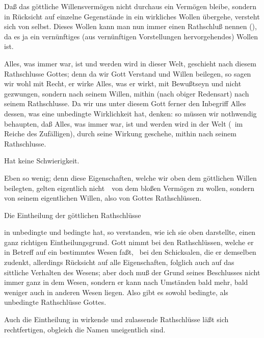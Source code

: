 \begin{aufza}
\item Daß das göttliche Willensvermögen nicht durchaus ein Vermögen bleibe, sondern in Rücksicht auf einzelne Gegenstände in ein wirkliches Wollen übergehe, versteht sich von selbst. Dieses Wollen kann man nun immer einen Rathschluß nennen (), da es ja ein vernünftiges (aus vernünftigen Vorstellungen hervorgehendes) Wollen ist.
\item Alles, was immer war, ist und werden wird in dieser Welt, geschieht nach diesem Rathschlusse Gottes; denn da wir Gott Verstand und Willen beilegen, so sagen wir wohl mit Recht, er wirke Alles, was er wirkt, mit Bewußtseyn und nicht gezwungen, sondern nach seinem Willen, mithin (nach obiger Redensart) nach seinem Rathschlusse. Da wir uns unter diesem Gott ferner den Inbegriff Alles dessen, was eine unbedingte Wirklichkeit hat, denken: so müssen wir nothwendig behaupten, daß Alles, was immer war, ist und werden wird in der Welt (\dh\ im Reiche des Zufälligen), durch seine Wirkung geschehe, mithin nach seinem Rathschlusse.
\item Hat keine Schwierigkeit.
\item Eben so wenig; denn diese Eigenschaften, welche wir oben dem göttlichen Willen beilegten, gelten eigentlich nicht~\ von dem bloßen Vermögen zu wollen, sondern von seinem eigentlichen Willen, also von Gottes Rathschlüssen.
\item Die Eintheilung der göttlichen Rathschlüsse
\begin{aufzb}
\item in unbedingte und bedingte hat, so verstanden, wie ich sie oben darstellte, einen ganz richtigen Eintheilungsgrund. Gott nimmt bei den Rathschlüssen, welche er in Betreff auf ein bestimmtes Wesen faßt, \dh\ bei den Schicksalen, die er demselben zudenkt, allerdings Rücksicht auf alle Eigenschaften, folglich auch auf das sittliche Verhalten des Wesens; aber doch muß der Grund seines Beschlusses nicht immer ganz in dem Wesen, sondern er kann nach Umständen bald mehr, bald weniger auch in anderen Wesen liegen. Also gibt es sowohl bedingte, als unbedingte Rathschlüsse Gottes.
\item Auch die Eintheilung in wirkende und zulassende Rathschlüsse läßt sich rechtfertigen, obgleich die Namen uneigentlich sind.
\end{aufzb}

\end{aufza}
